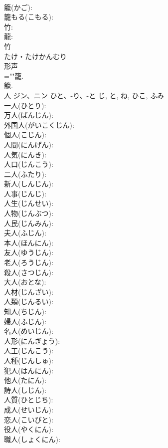 \documentclass[8pt]{extreport}
\begin{document}
\begin{CJK}{UTF8}{min}
\\	籠(かご): 
\\	籠もる(こもる): 
\\	竹: 
\\	龍: 
\\	竹	
\\	たけ・たけかんむり	
\\	形声 
\\	=""籠.
\\	籠.
\\	人	ジン、ニン	ひと、-り、-と	じ, と, ね, ひこ, ふみ	
\\	一人(ひとり): 
\\	万人(ばんじん): 
\\	外国人(がいこくじん): 
\\	個人(こじん): 
\\	人間(にんげん): 
\\	人気(にんき): 
\\	人口(じんこう): 
\\	二人(ふたり): 
\\	新人(しんじん): 
\\	人事(じんじ): 
\\	人生(じんせい): 
\\	人物(じんぶつ): 
\\	人民(じんみん): 
\\	夫人(ふじん): 
\\	本人(ほんにん): 
\\	友人(ゆうじん): 
\\	老人(ろうじん): 
\\	殺人(さつじん): 
\\	大人(おとな): 
\\	人材(じんざい): 
\\	人類(じんるい): 
\\	知人(ちじん): 
\\	婦人(ふじん): 
\\	名人(めいじん): 
\\	人形(にんぎょう): 
\\	人工(じんこう): 
\\	人種(じんしゅ): 
\\	犯人(はんにん): 
\\	他人(たにん): 
\\	詩人(しじん): 
\\	人質(ひとじち): 
\\	成人(せいじん): 
\\	恋人(こいびと): 
\\	役人(やくにん): 
\\	職人(しょくにん): 

\end{CJK}
\end{document}

